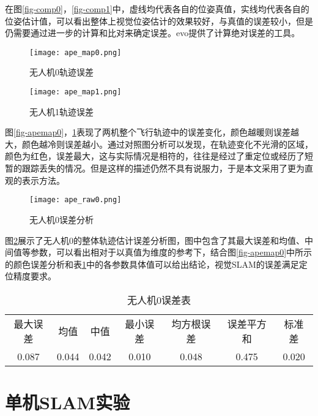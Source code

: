 在图\ref{fig-comp0}，\ref{fig-comp1}中，虚线均代表各自的位姿真值，实线均代表各自的位姿估计值，可以看出整体上视觉位姿估计的效果较好，与真值的误差较小，但是仍需要通过进一步的计算和比对来确定误差。evo提供了计算绝对误差的工具。

\begin{figure}[htbp]
	\centering
	\begin{minipage}[t]{0.45\columnwidth} %
		\centering
		\texttt{[image: ape\_map0.png]}
		\caption{无人机0轨迹误差}
		\label{fig-apemap0}
	\end{minipage}
	\begin{minipage}[t]{0.45\columnwidth}
		\centering
		\texttt{[image: ape\_map1.png]}
		\caption{无人机1轨迹误差}
		\label{fig-apemap1}
	\end{minipage}
\end{figure}

图\ref{fig-apemap0}，\ref{fig-apemap1}表现了两机整个飞行轨迹中的误差变化，颜色越暖则误差越大，颜色越冷则误差越小。通过对照图分析可以发现，在轨迹变化不光滑的区域，颜色为红色，误差最大，这与实际情况是相符的，往往是经过了重定位或经历了短暂的跟踪丢失的情况。但是这样的描述仍然不具有说服力，于是本文采用了更为直观的表示方法。

\begin{figure}[!ht]
	\centering
	\texttt{[image: ape\_raw0.png]}
	\caption{无人机0误差分析}
	\label{fig-aperaw0}
\end{figure}

图\ref{fig-aperaw0}展示了无人机0的整体轨迹估计误差分析图，图中包含了其最大误差和均值、中间值等参数，可以看出相对于以真值为维度的参考下，结合图\ref{fig-apemap0}中所示的颜色误差分析和表\ref{error-euroc}中的各参数具体值可以给出结论，视觉SLAM的误差满足定位精度要求。

\begin{table}[!htbp]
	\centering
	\caption{无人机0误差表}\label{error-euroc}%
	\begin{tabular}{ccccccc}
		\toprule
		
		最大误差 & 均值 & 中值 & 最小误差 & 均方根误差 & 误差平方和 & 标准差\\
		0.087 & 0.044 & 0.042 &  0.010 & 0.048 & 0.475 & 0.020\\
		
		\bottomrule
	\end{tabular}
\end{table}

\section{单机SLAM实验}

